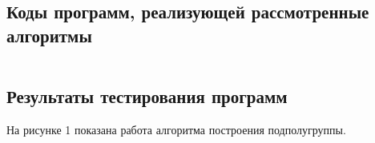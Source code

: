 \documentclass[bachelor, och, labwork]{shiza}
\begin{document}


        \subsection{Коды программ, реализующей рассмотренные алгоритмы}

        \inputminted[fontsize=\small]{python}{code/aua-lab-4.py}

      \newpage
      
      \subsection{Результаты тестирования программ}
      
      На рисунке 1 показана работа алгоритма построения подполугруппы.
\end{document}
